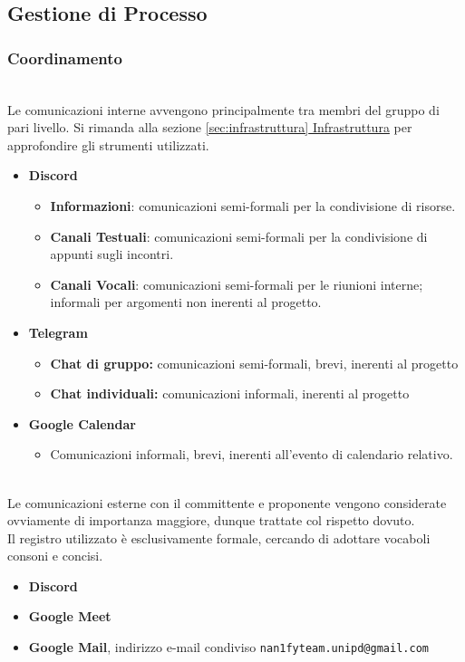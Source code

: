 \subsection{Gestione di Processo}
\subsubsection{Coordinamento}
\\
Le comunicazioni interne avvengono principalmente tra membri del gruppo di pari livello. Si rimanda alla sezione \hyperref[sec:infrastruttura]{\ref{sec:infrastruttura} Infrastruttura} per approfondire gli strumenti utilizzati.
\begin{itemize}
  \item{\textbf{Discord}}
  \begin{itemize}
    \item \textbf{Informazioni}: comunicazioni semi-formali per la condivisione di risorse.
    \item \textbf{Canali Testuali}: comunicazioni semi-formali per la condivisione di appunti sugli incontri.
    \item \textbf{Canali Vocali}: comunicazioni semi-formali per le riunioni interne; informali per argomenti non inerenti al progetto.
  \end{itemize}
  \item{\textbf{Telegram}}
  \begin{itemize}
    \item{\textbf{Chat di gruppo:} comunicazioni semi-formali, brevi, inerenti al progetto}
    \item{\textbf{Chat individuali:} comunicazioni informali, inerenti al progetto}
  \end{itemize}
  \item{\textbf{Google Calendar}}
  \begin{itemize}
    \item{Comunicazioni informali, brevi, inerenti all'evento di calendario relativo.}
  \end{itemize}
\end{itemize}
\\
Le comunicazioni esterne con il committente e proponente vengono considerate ovviamente di importanza maggiore, dunque trattate col rispetto dovuto.\\
Il registro utilizzato è esclusivamente formale, cercando di adottare vocaboli consoni e concisi.
\begin{itemize}
  \item{\textbf{Discord}}
  \item{\textbf{Google Meet}}
  \item{\textbf{Google Mail}, indirizzo e-mail condiviso \texttt{nan1fyteam.unipd@gmail.com}}
\end{itemize}
